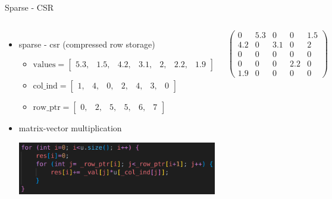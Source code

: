 \documentclass[aspectratio=169,xcolor=dvipsnames]{beamer}
\begin{document}
\begin{frame}{Sparse - CSR}
    \begin{columns}[c] %

\begin{itemize}
\item sparse - csr (compressed row storage)
	\begin{itemize}
       \item $\mathrm{values} = \begin{bmatrix}
		5.3, & 1.5, & 4.2, & 3.1, & 2, & 2.2, & 1.9 
		\end{bmatrix}$
		\item $\mathrm{col\_ind} = \begin{bmatrix}
		1, & 4, & 0, & 2, & 4, & 3, & 0 
		\end{bmatrix}$
		\item $\mathrm{row\_ptr} = \begin{bmatrix}
		0, & 2, & 5, & 5, & 6, & 7 
		\end{bmatrix}$
	\end{itemize}
\item matrix-vector multiplication
\begin{center}
    \includegraphics[width=0.8\linewidth]{matrix_vector_csr.png}
    \end{center}
\end{itemize}
        
        $ \left( \begin{array}{rrrrr} 
0 & 5.3 & 0 & 0 & 1.5\\ 
4.2 & 0& 3.1 & 0 & 2\\ 
0 & 0 & 0 & 0 & 0 \\
0 & 0 & 0 & 2.2 & 0 \\
1.9 & 0 & 0 & 0 & 0
\end{array} \right) $

    \end{columns}
\end{frame}

\end{document}
